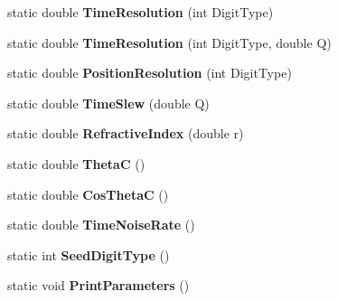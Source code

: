 \begin{DoxyCompactItemize}
\item 
\hypertarget{classParameters_a4a79efe76cdd7f76870e71936f3bc006}{static double {\bfseries Time\-Resolution} (int Digit\-Type)}\label{classParameters_a4a79efe76cdd7f76870e71936f3bc006}

\item 
\hypertarget{classParameters_a96b3aa83418fef97061a4e7647343989}{static double {\bfseries Time\-Resolution} (int Digit\-Type, double Q)}\label{classParameters_a96b3aa83418fef97061a4e7647343989}

\item 
\hypertarget{classParameters_ac6f65898fef36531ed9fddf04708b577}{static double {\bfseries Position\-Resolution} (int Digit\-Type)}\label{classParameters_ac6f65898fef36531ed9fddf04708b577}

\item 
\hypertarget{classParameters_aecd4991eb52328637dc849c04e254d0f}{static double {\bfseries Time\-Slew} (double Q)}\label{classParameters_aecd4991eb52328637dc849c04e254d0f}

\item 
\hypertarget{classParameters_ad4f2815a0e46ecdd573fda40d3ef4710}{static double {\bfseries Refractive\-Index} (double r)}\label{classParameters_ad4f2815a0e46ecdd573fda40d3ef4710}

\item 
\hypertarget{classParameters_a6feb77688ce48e84f5450332552c348b}{static double {\bfseries Theta\-C} ()}\label{classParameters_a6feb77688ce48e84f5450332552c348b}

\item 
\hypertarget{classParameters_a87680cdd958e703d73854700fb675a73}{static double {\bfseries Cos\-Theta\-C} ()}\label{classParameters_a87680cdd958e703d73854700fb675a73}

\item 
\hypertarget{classParameters_aa5c5a5e9cfbc338de62e659de1950543}{static double {\bfseries Time\-Noise\-Rate} ()}\label{classParameters_aa5c5a5e9cfbc338de62e659de1950543}

\item 
\hypertarget{classParameters_a5c88994da52292b5474849482a524a72}{static int {\bfseries Seed\-Digit\-Type} ()}\label{classParameters_a5c88994da52292b5474849482a524a72}

\item 
\hypertarget{classParameters_a07f0ae805cea2c93da65f5f0e9e7fc21}{static void {\bfseries Print\-Parameters} ()}\label{classParameters_a07f0ae805cea2c93da65f5f0e9e7fc21}

\end{DoxyCompactItemize}
